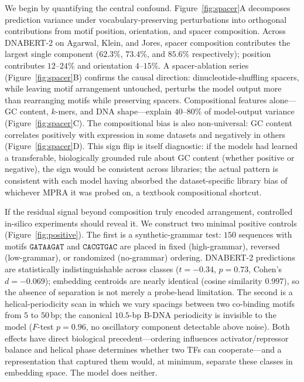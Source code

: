 \documentclass{article}
\begin{document}
We begin by quantifying the central confound. Figure~\ref{fig:spacer}A decomposes prediction variance under vocabulary-preserving perturbations into orthogonal contributions from motif position, orientation, and spacer composition. Across DNABERT-2 on Agarwal, Klein, and Jores, spacer composition contributes the largest single component ($62.3\%$, $73.4\%$, and $85.6\%$ respectively); position contributes $12$--$24\%$ and orientation $4$--$15\%$. A spacer-ablation series (Figure~\ref{fig:spacer}B) confirms the causal direction: dinucleotide-shuffling spacers, while leaving motif arrangement untouched, perturbs the model output more than rearranging motifs while preserving spacers. Compositional features alone---GC content, $k$-mers, and DNA shape---explain $40$--$80\%$ of model-output variance (Figure~\ref{fig:spacer}C). The compositional bias is also non-universal: GC content correlates positively with expression in some datasets and negatively in others (Figure~\ref{fig:spacer}D). This sign flip is itself diagnostic: if the models had learned a transferable, biologically grounded rule about GC content (whether positive or negative), the sign would be consistent across libraries; the actual pattern is consistent with each model having absorbed the dataset-specific library bias of whichever MPRA it was probed on, a textbook compositional shortcut.

If the residual signal beyond composition truly encoded arrangement, controlled in-silico experiments should reveal it. We construct two minimal positive controls (Figure~\ref{fig:positive}). The first is a synthetic-grammar test: $150$ sequences with motifs $\mathtt{GATAAGAT}$ and $\mathtt{CACGTGAC}$ are placed in fixed (high-grammar), reversed (low-grammar), or randomized (no-grammar) ordering. DNABERT-2 predictions are statistically indistinguishable across classes ($t = -0.34$, $p = 0.73$, Cohen's $d = -0.069$); embedding centroids are nearly identical (cosine similarity $0.997$), so the absence of separation is not merely a probe-head limitation. The second is a helical-periodicity scan in which we vary spacings between two co-binding motifs from $5$ to $50$\,bp; the canonical $10.5$-bp B-DNA periodicity is invisible to the model ($F$-test $p = 0.96$, no oscillatory component detectable above noise). Both effects have direct biological precedent---ordering influences activator/repressor balance and helical phase determines whether two TFs can cooperate---and a representation that captured them would, at minimum, separate these classes in embedding space. The model does neither.
\end{document}
